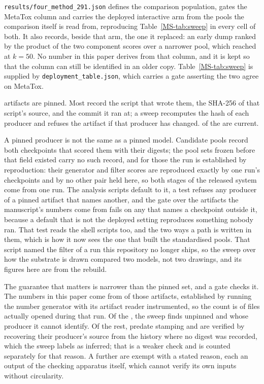 \documentclass[journal=jcisd8,manuscript=suppinfo,layout=onecolumn]{achemso}
\begin{document}
\texttt{results/four\_method\_291.json} defines the comparison population, gates the MetaTox
column and carries the deployed interactive arm from the pools the comparison itself is read from,
reproducing Table~\ref{MS-tab:sweep} in every cell of both. It also records, beside that arm, the
one it replaced: an early dump ranked by the product of the two component scores over a narrower
pool, which reached \numFourmethodSupersededFiveZero{} at $k=50$. No number in this paper derives
from that column, and it is kept so that the column can still be identified in an older copy.
Table~\ref{MS-tab:sweep} is supplied by
\texttt{deployment\_table.json}, which carries a gate asserting the two agree on MetaTox.

\numProvPinned{} artifacts are pinned. Most record the script that wrote them, the SHA-256 of
that script's source, and the commit it ran at; a sweep recomputes the hash of each producer and
refuses the artifact if that producer has changed. \numProvPinnedcurrent{} of the
\numProvPinned{} are current.

A pinned producer is not the same as a pinned model. Candidate pools record both checkpoints that
scored them with their digests; the pool sets frozen before that field existed carry no such
record, and for those the run is established by reproduction: their generator and filter scores
are reproduced exactly by one run's checkpoints and by no other pair held here, so both stages of
the released system come from one run. The analysis scripts default to it, a test refuses any
producer of a pinned artifact that names another, and the gate over the artifacts the
manuscript's numbers come from fails on any that names a checkpoint outside it, because a default
that is not the deployed setting reproduces something nobody ran. That test reads the shell
scripts too, and the two ways a path is written in them, which is how it now sees the one that
built the standardised pools. That script named the filter of a run this repository no longer
ships, so the sweep over how the substrate is drawn compared two models, not two drawings,
and its figures here are from the rebuild.

The guarantee that matters is narrower than the pinned set, and a gate checks it. The numbers in
this paper come from \numProvSources{} of those artifacts, established
by running the number generator with its artifact reader instrumented, so the count is of files
actually opened during that run. Of the \numProvSources{}, the sweep finds
\numProvSourcesunpinnedWord{} unpinned and \numProvSourcesunverifiableWord{} whose producer it
cannot identify. Of the rest, \numProvSourcesinferredWord{} predate stamping and are verified by
recovering their producer's source from the history where no digest was recorded, which the
sweep labels as inferred; that is a weaker check and is counted separately for that reason.
A further \numProvSourcesexemptWord{} are exempt with a stated reason, each an output of the
checking
apparatus itself, which cannot verify its own inputs without circularity.
\end{document}
